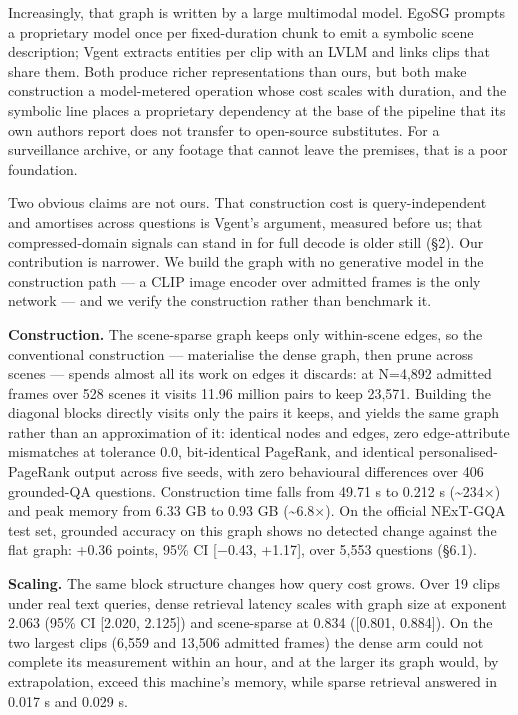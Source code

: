 \documentclass[sigconf,review,anonymous]{acmart}
\begin{document}
Increasingly, that graph is written by a large multimodal model. EgoSG prompts a proprietary
model once per fixed-duration chunk to emit a symbolic scene description; Vgent extracts
entities per clip with an LVLM and links clips that share them. Both produce richer
representations than ours, but both make construction a model-metered operation whose cost
scales with duration, and the symbolic line places a proprietary dependency at the base of
the pipeline that its own authors report does not transfer to open-source substitutes. For a
surveillance archive, or any footage that cannot leave the premises, that is a poor
foundation.

Two obvious claims are not ours. That construction cost is query-independent and amortises
across questions is Vgent's argument, measured before us; that compressed-domain signals
can stand in for full decode is older still (§2). Our contribution is narrower. We build the
graph with no generative model in the construction path --- a CLIP image encoder over
admitted frames is the only network --- and we verify the construction rather than benchmark
it.

\textbf{Construction.} The scene-sparse graph keeps only within-scene edges, so the conventional
construction --- materialise the dense graph, then prune across scenes --- spends almost all its
work on edges it discards: at N=4,892 admitted frames over 528 scenes it visits 11.96 million pairs
to keep 23,571. Building the diagonal blocks directly visits only the pairs it keeps, and
yields the same graph rather than an approximation of it: identical nodes and edges, zero
edge-attribute mismatches at tolerance 0.0, bit-identical PageRank, and identical
personalised-PageRank output across five seeds, with zero behavioural differences
over 406 grounded-QA questions. Construction time falls from 49.71 s to 0.212 s
(\textasciitilde234\ensuremath{\times}) and peak memory from 6.33 GB to 0.93 GB (\textasciitilde6.8\ensuremath{\times}). On the official NExT-GQA test
set, grounded accuracy on this graph shows no detected change against the flat graph: +0.36
points, 95\% CI {[}\ensuremath{-}0.43, +1.17{]}, over 5,553 questions (§6.1).

\textbf{Scaling.} The same block structure changes how query cost grows. Over 19 clips under real
text queries, dense retrieval latency scales with graph size at exponent 2.063 (95\% CI
{[}2.020, 2.125{]}) and scene-sparse at 0.834 ({[}0.801, 0.884{]}). On the two largest clips
(6,559 and 13,506 admitted frames) the dense arm could not complete its measurement within an
hour, and at the larger its graph would, by extrapolation, exceed this machine's memory, while sparse
retrieval answered in 0.017 s and 0.029 s.
\end{document}
